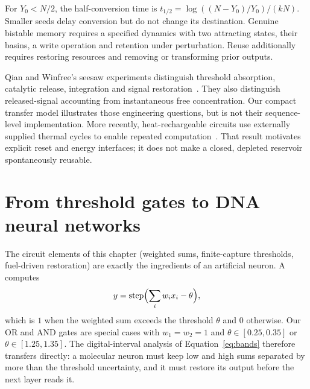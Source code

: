 
For $Y_0<N/2$, the half-conversion time is
$t_{1/2}=\log((N-Y_0)/Y_0)/(kN)$. Smaller seeds delay conversion but do not
change its destination. Genuine bistable memory requires a specified dynamics
with two attracting states, their basins, a write operation and retention
under perturbation. Reuse additionally requires restoring resources and
removing or transforming prior outputs.

Qian and Winfree's seesaw experiments distinguish threshold absorption,
catalytic release, integration and signal restoration~\cite{QianWinfree2011}.
They also distinguish released-signal accounting from instantaneous free
concentration. Our compact transfer model illustrates those engineering
questions, but is not their sequence-level implementation.
More recently, heat-rechargeable circuits use externally supplied thermal
cycles to enable repeated computation~\cite{SongQian2025}. That result motivates
explicit reset and energy interfaces; it does not make a closed, depleted
reservoir spontaneously reusable.


\section{From threshold gates to DNA neural networks}\label{sec:neural}
The circuit elements of this chapter (weighted sums, finite-capture thresholds,
fuel-driven restoration) are exactly the ingredients of an artificial neuron. A
 computes
\begin{equation}
 y=\operatorname{step}\Bigl(\sum_i w_ix_i-\theta\Bigr),
 \label{eq:neuron}
\end{equation}
which is $1$ when the weighted sum exceeds the threshold $\theta$ and $0$
otherwise. Our OR and AND gates are special cases with $w_1=w_2=1$ and
$\theta\in[0.25,0.35]$ or $\theta\in[1.25,1.35]$. The digital-interval analysis
of Equation~\eqref{eq:bands} therefore transfers directly: a molecular neuron must
keep low and high sums separated by more than the threshold uncertainty, and
it must restore its output before the next layer reads it.



